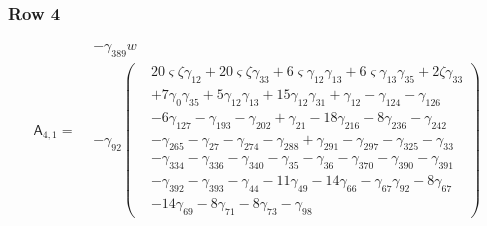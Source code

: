 \subsubsection*{Row 4}
\[\mathsf A_{4,1}=\begin{aligned}&- \gamma_{389} w\\&- \gamma_{92} \left(\begin{aligned}& 20 \varsigma  \zeta  \gamma_{12}+ 20 \varsigma  \zeta  \gamma_{33}+ 6 \varsigma  \gamma_{12} \gamma_{13}+ 6 \varsigma  \gamma_{13} \gamma_{35}+ 2 \zeta  \gamma_{33}\\&+ 7 \gamma_{0} \gamma_{35}+ 5 \gamma_{12} \gamma_{13}+ 15 \gamma_{12} \gamma_{31}+ \gamma_{12}- \gamma_{124}- \gamma_{126}\\&- 6 \gamma_{127}- \gamma_{193}- \gamma_{202}+ \gamma_{21}- 18 \gamma_{216}- 8 \gamma_{236}- \gamma_{242}\\&- \gamma_{265}- \gamma_{27}- \gamma_{274}- \gamma_{288}+ \gamma_{291}- \gamma_{297}- \gamma_{325}- \gamma_{33}\\&- \gamma_{334}- \gamma_{336}- \gamma_{340}- \gamma_{35}- \gamma_{36}- \gamma_{370}- \gamma_{390}- \gamma_{391}\\&- \gamma_{392}- \gamma_{393}- \gamma_{44}- 11 \gamma_{49}- 14 \gamma_{66}- \gamma_{67} \gamma_{92}- 8 \gamma_{67}\\&- 14 \gamma_{69}- 8 \gamma_{71}- 8 \gamma_{73}- \gamma_{98}\end{aligned}\right)\end{aligned}\]

